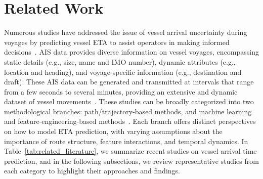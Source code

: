 \documentclass[conference]{IEEEtran}
\begin{document}
\section{Related Work}
Numerous studies have addressed the issue of vessel arrival uncertainty during voyages by predicting vessel ETA to assist operators in making informed decisions~\cite{yuShipArrivalPrediction2018,chuVesselArrivalTime2025,duSegmentedETAPrediction2025,nomanReviewVesselTime2025}. AIS data provides diverse information on vessel voyages, encompassing static details (e.g., size, name and IMO number), dynamic attributes (e.g., location and heading), and voyage-specific information (e.g., destination and draft). These AIS data can be generated and transmitted at intervals that range from a few seconds to several minutes, providing an extensive and dynamic dataset of vessel movements~\cite{yangHarnessingPowerMachine2024, chuEvaluationPredictionPunctuality2023}. These studies can be broadly categorized into two methodological branches: path/trajectory-based methods, and machine learning and feature-engineering-based methods~\cite{leiPredictingVesselArrival2024}. Each branch offers distinct perspectives on how to model ETA prediction, with varying assumptions about the importance of route structure, feature interactions, and temporal dynamics. In Table~\ref{tab:related_literature}, we summarize recent studies on vessel arrival time prediction, and in the following subsections, we review representative studies from each category to highlight their approaches and findings.
\end{document}
